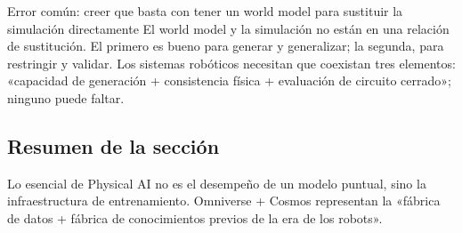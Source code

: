 \begin{warningbox}{Error común: creer que basta con tener un world model para sustituir la simulación directamente}
El world model y la simulación no están en una relación de sustitución. El primero es bueno para generar y generalizar; la segunda, para restringir y validar. Los sistemas robóticos necesitan que coexistan tres elementos: «capacidad de generación + consistencia física + evaluación de circuito cerrado»; ninguno puede faltar.
\end{warningbox}

\subsection{Resumen de la sección}
Lo esencial de Physical AI no es el desempeño de un modelo puntual, sino la infraestructura de entrenamiento. Omniverse + Cosmos representan la «fábrica de datos + fábrica de conocimientos previos de la era de los robots».

